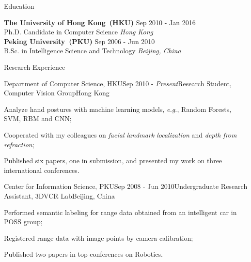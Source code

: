 \documentclass{cv_professional-en} %
\begin{document}

\begin{rSection}{Education}

{\bf The University of Hong Kong~(HKU)} \hfill Sep 2010 - Jan 2016 \\ 
Ph.D. Candidate in Computer Science \hfill {\em Hong Kong}\smallskip \\
{\bf Peking University~(PKU)} \hfill Sep 2006 - Jun 2010 \\ 
B.Sc. in Intelligence Science and Technology \hfill {\em Beijing, China} 

\end{rSection}


\begin{rSection}{Research Experience}
    
\begin{rSubsection}{Department of Computer Science, HKU}{Sep 2010 - \textit{Present}}{Research Student, Computer Vision Group}{Hong Kong}
\item Analyze hand postures with machine learning models, \textit{e.g.}, Random Forests, SVM, RBM and CNN;
\item Cooperated with my colleagues on \textit{facial landmark localization} and \textit{depth from refraction};
\item Published six papers, one in submission, and presented my work on three international conferences.
\end{rSubsection}

\begin{rSubsection}{Center for Information Science, PKU}{Sep 2008 - Jun 2010}{Undergraduate Research Assistant, 3DVCR Lab}{Beijing, China}
    \item Performed semantic labeling for range data obtained from an intelligent car in POSS group;
    \item Registered range data with image points by camera calibration;
    \item Published two papers in top conferences on Robotics.
\end{rSubsection}

\end{rSection}
\end{document}

